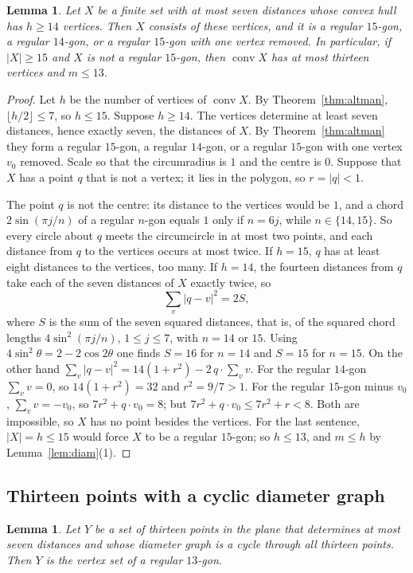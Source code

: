 \documentclass[11pt]{amsart}
\newtheorem{lemma}[theorem]{Lemma}
\theoremstyle{definition}
\theoremstyle{remark}
\newcommand{\conv}{\operatorname{conv}}
\begin{document}
\begin{lemma}\label{lem:hull}
Let $X$ be a finite set with at most seven distances whose convex hull has $h\ge14$ vertices. Then $X$
consists of these vertices, and it is a regular $15$-gon, a regular $14$-gon, or a regular $15$-gon with
one vertex removed. In particular, if $|X|\ge15$ and $X$ is not a regular $15$-gon, then $\conv X$ has at most
thirteen vertices and $m\le13$.
\end{lemma}

\begin{proof}
Let $h$ be the number of vertices of $\conv X$. By Theorem~\ref{thm:altman}, $\lfloor h/2\rfloor\le7$, so
$h\le15$. Suppose $h\ge14$. The vertices determine at least seven distances, hence exactly seven, the
distances of $X$. By Theorem~\ref{thm:altman} they form a regular $15$-gon, a regular $14$-gon, or a regular
$15$-gon with one vertex $v_0$ removed. Scale so that the circumradius is $1$ and the centre is $0$.
Suppose that $X$ has a point $q$ that is not a vertex; it lies in the polygon, so $r=|q|<1$.

The point $q$ is not the centre: its distance to the vertices would be $1$, and a chord $2\sin(\pi j/n)$ of a
regular $n$-gon equals $1$ only if $n=6j$, while $n\in\{14,15\}$. So every circle about $q$ meets the
circumcircle in at most two points, and each distance from $q$ to the vertices occurs at most twice. If
$h=15$, $q$ has at least eight distances to the vertices, too many. If $h=14$, the fourteen distances from $q$
take each of the seven distances of $X$ exactly twice, so
\[
  \sum_{v}|q-v|^2 = 2S,
\]
where $S$ is the sum of the seven squared distances, that is, of the squared chord lengths $4\sin^2(\pi j/n)$,
$1\le j\le7$, with $n=14$ or $15$. Using $4\sin^2\theta=2-2\cos2\theta$ one finds $S=16$ for $n=14$ and
$S=15$ for $n=15$. On the other hand $\sum_v|q-v|^2=14(1+r^2)-2\,q\cdot\sum_v v$. For the regular $14$-gon
$\sum_v v=0$, so $14(1+r^2)=32$ and $r^2=9/7>1$. For the regular $15$-gon minus $v_0$, $\sum_v v=-v_0$, so
$7r^2+q\cdot v_0=8$; but $7r^2+q\cdot v_0\le7r^2+r<8$. Both are impossible, so $X$ has no point
besides the vertices. For the last sentence, $|X|=h\le15$ would force $X$ to be a regular $15$-gon; so
$h\le13$, and $m\le h$ by Lemma~\ref{lem:diam}(1).
\end{proof}

\subsection{Thirteen points with a cyclic diameter graph}
\begin{lemma}\label{lem:C13}
Let $Y$ be a set of thirteen points in the plane that determines at most seven distances and whose
diameter graph is a cycle through all thirteen points. Then $Y$ is the vertex set of a regular $13$-gon.
\end{lemma}
\end{document}
